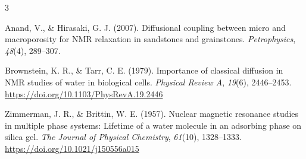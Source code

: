 \documentclass[11pt,a4paper]{article}
\begin{document}
{\small
\begin{thebibliography}{3}
\setlength{\itemsep}{2pt}

Anand, V., \& Hirasaki, G. J. (2007). Diffusional coupling between micro and macroporosity for NMR relaxation in sandstones and grainstones.
\emph{Petrophysics}, \emph{48}(4), 289--307.

Brownstein, K. R., \& Tarr, C. E. (1979). Importance of classical diffusion in NMR studies of water in biological cells.
\emph{Physical Review A}, \emph{19}(6), 2446--2453. \url{https://doi.org/10.1103/PhysRevA.19.2446}

Zimmerman, J. R., \& Brittin, W. E. (1957). Nuclear magnetic resonance studies in multiple phase systems: Lifetime of a water molecule
in an adsorbing phase on silica gel. \emph{The Journal of Physical Chemistry}, \emph{61}(10), 1328--1333. \url{https://doi.org/10.1021/j150556a015}
\end{thebibliography}
}
\end{document}
